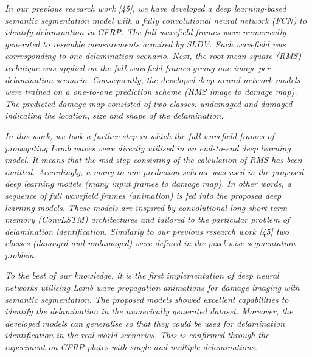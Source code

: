\documentclass[11pt,a2paper]{report}
\begin{document}
\emph{In our previous research work [45], we have developed a deep learning-based
semantic segmentation model with a fully convolutional neural network (FCN)
to identify delamination in CFRP.	
The full wavefield frames were
numerically generated to resemble measurements acquired by SLDV.
Each wavefield was corresponding to one delamination scenario.
Next, the root mean square (RMS) technique
was applied on the full wavefield frames giving one image per delamination scenario.
Consequently,
the developed deep neural network models were trained on a one-to-one prediction scheme (RMS image to damage map).
The predicted damage map consisted of two classes: undamaged and damaged indicating the location, size and shape of the delamination.}

\emph{In this work, we took a further step in which the full wavefield frames of
propagating Lamb waves were directly utilised in an end-to-end
deep learning model.
It means that the mid-step consisting of the calculation of RMS has been omitted.
Accordingly, a many-to-one
prediction scheme was used in the proposed deep learning models (many input frames to damage map).
In other words, a sequence of full wavefield frames (animation) is fed into the proposed deep learning models.
These models are inspired by convolutional long short-term memory (ConvLSTM) architectures and tailored to the particular problem of delamination identification.
Similarly to our previous research work [45] two classes (damaged and undamaged) were defined in the pixel-wise segmentation problem.}

\emph{To the best of our knowledge, it is the first
implementation of deep neural networks utilising Lamb wave propagation animations
for damage imaging with semantic segmentation. 
The proposed models
showed excellent capabilities to identify the delamination in the numerically
generated dataset.
Moreover, the developed models can generalise so that they could be used for delamination
identification in the real world scenarios.
This is confirmed through the experiment on CFRP plates with single and multiple delaminations.}
	\\ \\
\end{document}
